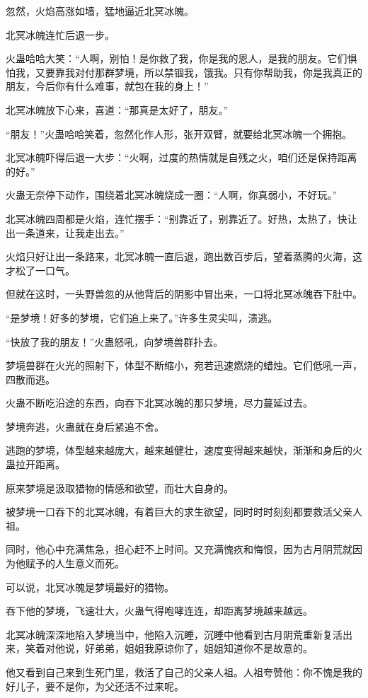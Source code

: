 \begin{this_body}
忽然，火焰高涨如墙，猛地逼近北冥冰魄。

北冥冰魄连忙后退一步。

火蛊哈哈大笑：“人啊，别怕！是你救了我，你是我的恩人，是我的朋友。它们惧怕我，又要靠我对付那群梦境，所以禁锢我，饿我。只有你帮助我，你是我真正的朋友，今后你有什么难事，就包在我的身上！”

北冥冰魄放下心来，喜道：“那真是太好了，朋友。”

“朋友！”火蛊哈哈笑着，忽然化作人形，张开双臂，就要给北冥冰魄一个拥抱。

北冥冰魄吓得后退一大步：“火啊，过度的热情就是自残之火，咱们还是保持距离的好。”

火蛊无奈停下动作，围绕着北冥冰魄烧成一圈：“人啊，你真弱小，不好玩。”

北冥冰魄四周都是火焰，连忙摆手：“别靠近了，别靠近了。好热，太热了，快让出一条道来，让我走出去。”

火焰只好让出一条路来，北冥冰魄一直后退，跑出数百步后，望着蒸腾的火海，这才松了一口气。

但就在这时，一头野兽忽的从他背后的阴影中冒出来，一口将北冥冰魄吞下肚中。

“是梦境！好多的梦境，它们追上来了。”许多生灵尖叫，溃逃。

“快放了我的朋友！”火蛊怒吼，向梦境兽群扑去。

梦境兽群在火光的照射下，体型不断缩小，宛若迅速燃烧的蜡烛。它们低吼一声，四散而逃。

火蛊不断吃沿途的东西，向吞下北冥冰魄的那只梦境，尽力蔓延过去。

梦境奔逃，火蛊就在身后紧追不舍。

逃跑的梦境，体型越来越庞大，越来越健壮，速度变得越来越快，渐渐和身后的火蛊拉开距离。

原来梦境是汲取猎物的情感和欲望，而壮大自身的。

被梦境一口吞下的北冥冰魄，有着巨大的求生欲望，同时时时刻刻都要救活父亲人祖。

同时，他心中充满焦急，担心赶不上时间。又充满愧疚和悔恨，因为古月阴荒就因为他赋予的人生意义而死。

可以说，北冥冰魄是梦境最好的猎物。

吞下他的梦境，飞速壮大，火蛊气得咆哮连连，却距离梦境越来越远。

北冥冰魄深深地陷入梦境当中，他陷入沉睡，沉睡中他看到古月阴荒重新复活出来，笑着对他说，好弟弟，姐姐我原谅你了，姐姐知道你不是故意的。

他又看到自己来到生死门里，救活了自己的父亲人祖。人祖夸赞他：你不愧是我的好儿子，要不是你，为父还活不过来呢。


\end{this_body}
